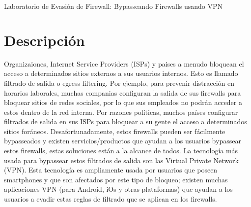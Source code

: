 
\newcommand{\commonfolder}{../../common-files}




\newcommand{\firewallFigs}{./Figs}





\begin{center}
{\LARGE Laboratorio de Evasión de Firewall: Bypasseando Firewalls usando VPN}
\end{center}



\setcounter{task}{1}
\newcommand{\tasks} {\bf {\noindent (\arabic{task})} \addtocounter{task}{1} \,}


\section{Descripción}

Organizaiones, Internet Service Providers (ISPs) y paises a menudo bloquean el acceso a determinados sitios externos a sus usuarios internos. Esto es llamado filtrado de salida o egress filtering.
Por ejemplo, para prevenir distracción en horarios laborales, muchas companias configuran la salida de sus firewalls para bloquear sitios de redes sociales, por lo que sus empleados no podrán acceder a estos dentro de la red interna. Por razones políticas, muchos países configurar filtrados de salida en sus ISPs para bloquear a su gente el acceso a determinados sitios foráneos. Desafortunadamente, estos firewalls pueden ser fácilmente bypasseados y existen servicios/productos que ayudan a los usuarios bypassear estos firewalls, estas soluciones están a la alcance de todos. La tecnología más usada para bypassear estos filtrados de salida son las Virtual Private Network (VPN).
Esta tecnología es ampliamente usada por usuarios que poseen smartphones y que son afectados por este tipo de bloqueo; existen muchas aplicaciones VPN (para Android, iOs y otras plataformas) que ayudan a los usuarios a evadir estas reglas de filtrado que se aplican en los firewalls.

